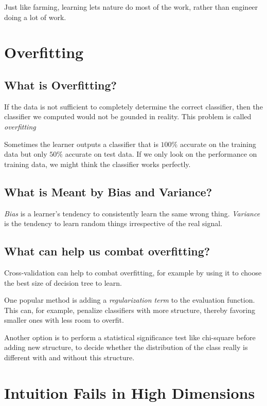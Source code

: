\documentclass[12pt]{article}
\begin{document}
Just like farming, learning lets nature do most of the work, rather than
engineer doing a lot of work.

\section{Overfitting}

\subsection{What is Overfitting?}

If the data is not sufficient to completely determine the correct classifier,
then the classifier we computed would not be gounded in reality. This problem
is called \emph{overfitting}

Sometimes the learner outputs a classifier that is $100\%$ accurate on the
training data but only $50\%$ accurate on test data. If we only look on the
performance on training data, we might think the classifier works perfectly.

\subsection{What is Meant by Bias and Variance?}

\emph{Bias} is a learner’s tendency to consistently learn the same wrong thing.
\emph{Variance} is the tendency to learn random things irrespective of the real
signal.

\subsection{What can help us combat overfitting?}

Cross-validation can help to combat overfitting, for example by using it to
choose the best size of decision tree to learn.

One popular method is adding a \emph{regularization term} to the evaluation
function. This can, for example, penalize classifiers with more structure,
thereby favoring smaller ones with less room to overfit.

Another option is to perform a statistical significance test like chi-square
before adding new structure, to decide whether the distribution of the class
really is different with and without this structure.

\section{Intuition Fails in High Dimensions}
\end{document}
